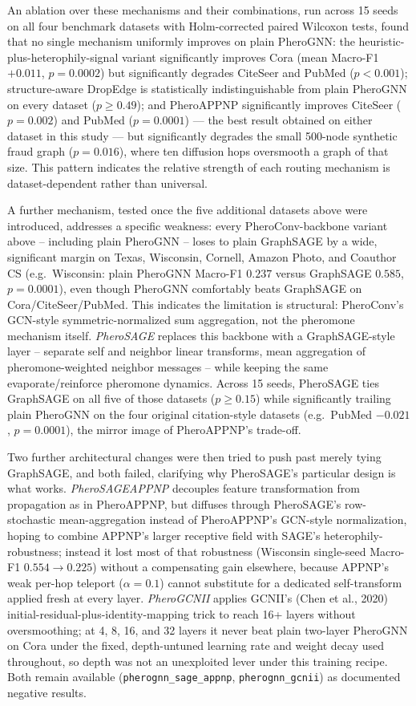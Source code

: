 An ablation over these mechanisms and their combinations, run across 15 seeds on all four benchmark datasets with Holm-corrected paired Wilcoxon tests, found that no single mechanism uniformly improves on plain PheroGNN: the heuristic-plus-heterophily-signal variant significantly improves Cora (mean Macro-F1 $+0.011$, $p=0.0002$) but significantly degrades CiteSeer and PubMed ($p<0.001$); structure-aware DropEdge is statistically indistinguishable from plain PheroGNN on every dataset ($p \geq 0.49$); and PheroAPPNP significantly improves CiteSeer ($p=0.002$) and PubMed ($p=0.0001$) — the best result obtained on either dataset in this study — but significantly degrades the small 500-node synthetic fraud graph ($p=0.016$), where ten diffusion hops oversmooth a graph of that size. This pattern indicates the relative strength of each routing mechanism is dataset-dependent rather than universal.

A further mechanism, tested once the five additional datasets above were introduced, addresses a specific weakness: every PheroConv-backbone variant above -- including plain PheroGNN -- loses to plain GraphSAGE by a wide, significant margin on Texas, Wisconsin, Cornell, Amazon Photo, and Coauthor CS (e.g.\ Wisconsin: plain PheroGNN Macro-F1 $0.237$ versus GraphSAGE $0.585$, $p=0.0001$), even though PheroGNN comfortably beats GraphSAGE on Cora/CiteSeer/PubMed. This indicates the limitation is structural: PheroConv's GCN-style symmetric-normalized sum aggregation, not the pheromone mechanism itself. \emph{PheroSAGE} replaces this backbone with a GraphSAGE-style layer -- separate self and neighbor linear transforms, mean aggregation of pheromone-weighted neighbor messages -- while keeping the same evaporate/reinforce pheromone dynamics. Across 15 seeds, PheroSAGE ties GraphSAGE on all five of those datasets ($p \geq 0.15$) while significantly trailing plain PheroGNN on the four original citation-style datasets (e.g.\ PubMed $-0.021$, $p=0.0001$), the mirror image of PheroAPPNP's trade-off.

Two further architectural changes were then tried to push past merely tying GraphSAGE, and both failed, clarifying why PheroSAGE's particular design is what works. \emph{PheroSAGEAPPNP} decouples feature transformation from propagation as in PheroAPPNP, but diffuses through PheroSAGE's row-stochastic mean-aggregation instead of PheroAPPNP's GCN-style normalization, hoping to combine APPNP's larger receptive field with SAGE's heterophily-robustness; instead it lost most of that robustness (Wisconsin single-seed Macro-F1 $0.554 \to 0.225$) without a compensating gain elsewhere, because APPNP's weak per-hop teleport ($\alpha=0.1$) cannot substitute for a dedicated self-transform applied fresh at every layer. \emph{PheroGCNII} applies GCNII's (Chen et al., 2020) initial-residual-plus-identity-mapping trick to reach 16+ layers without oversmoothing; at 4, 8, 16, and 32 layers it never beat plain two-layer PheroGNN on Cora under the fixed, depth-untuned learning rate and weight decay used throughout, so depth was not an unexploited lever under this training recipe. Both remain available (\texttt{pherognn\_sage\_appnp}, \texttt{pherognn\_gcnii}) as documented negative results.

